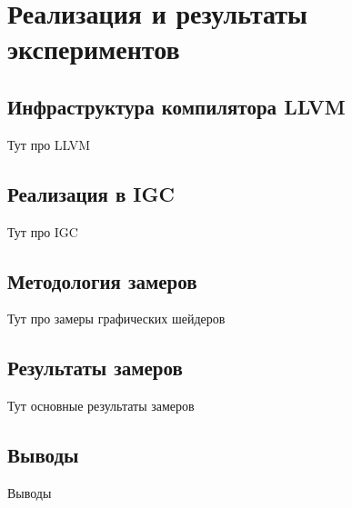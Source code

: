 \chapter{Реализация и результаты экспериментов}\label{ch:results}

\section{Инфраструктура компилятора LLVM}\label{sec:results/llvm}

Тут про LLVM

\section{Реализация в IGC}\label{sec:results/igc}

Тут про IGC

\section{Методология замеров}\label{sec:results/measures}

Тут про замеры графических шейдеров

\section{Результаты замеров}\label{sec:results/results}

Тут основные результаты замеров

\section{Выводы}\label{sec:results/outcome}

Выводы

\FloatBarrier
